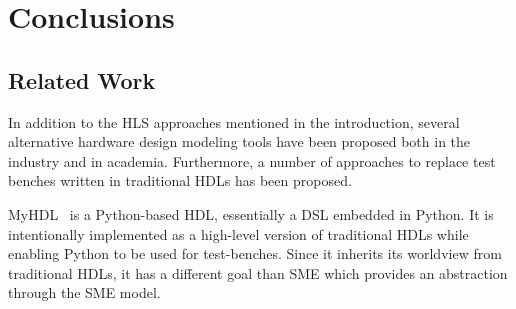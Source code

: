 \chapter{Conclusions}





\section{Related Work}


In addition to the HLS approaches mentioned in the introduction, several
alternative hardware design modeling tools have been proposed both in the
industry and in academia. Furthermore, a number of approaches to replace test
benches written in traditional HDLs has been proposed.

MyHDL~\cite{myhdl} is a Python-based HDL, essentially a DSL embedded in
Python. It is intentionally implemented as a high-level version of traditional
HDLs while enabling Python to be used for test-benches. Since it inherits its
worldview from traditional HDLs, it has a different goal than SME which provides
an abstraction through the SME model.

